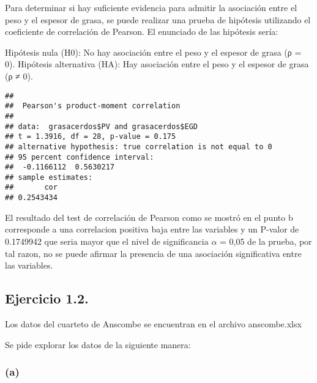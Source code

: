 \documentclass[
]{article}
\newenvironment{Shaded}{\begin{snugshade}}{\end{snugshade}}
\newcommand{\AttributeTok}[1]{\textcolor[rgb]{0.77,0.63,0.00}{#1}}
\newcommand{\FunctionTok}[1]{\textcolor[rgb]{0.00,0.00,0.00}{#1}}
\newcommand{\NormalTok}[1]{#1}
\newcommand{\OtherTok}[1]{\textcolor[rgb]{0.56,0.35,0.01}{#1}}
\newcommand{\SpecialCharTok}[1]{\textcolor[rgb]{0.00,0.00,0.00}{#1}}
\newcommand{\StringTok}[1]{\textcolor[rgb]{0.31,0.60,0.02}{#1}}
\begin{document}
Para determinar si hay suficiente evidencia para admitir la asociación
entre el peso y el espesor de grasa, se puede realizar una prueba de
hipótesis utilizando el coeficiente de correlación de Pearson. El
enunciado de las hipótesis sería:

Hipótesis nula (H0): No hay asociación entre el peso y el espesor de
grasa (ρ = 0). Hipótesis alternativa (HA): Hay asociación entre el peso
y el espesor de grasa (ρ ≠ 0).

\begin{Shaded}
\end{Shaded}

\begin{verbatim}
## 
##  Pearson's product-moment correlation
## 
## data:  grasacerdos$PV and grasacerdos$EGD
## t = 1.3916, df = 28, p-value = 0.175
## alternative hypothesis: true correlation is not equal to 0
## 95 percent confidence interval:
##  -0.1166112  0.5630217
## sample estimates:
##       cor 
## 0.2543434
\end{verbatim}

El resultado del test de correlación de Pearson como se mostró en el
punto b corresponde a una correlacion positiva baja entre las variables
y un P-valor de 0.1749942 que seria mayor que el nivel de significancia
\(\alpha\) = 0,05 de la prueba, por tal razon, no se puede afirmar la
presencia de una asociación significativa entre las variables.

\hypertarget{ejercicio-1.2.}{%
\subsection{Ejercicio 1.2.}\label{ejercicio-1.2.}}

Los datos del cuarteto de Anscombe se encuentran en el archivo
anscombe.xlsx

Se pide explorar los datos de la siguiente manera:

\hypertarget{a-1}{%
\subsubsection{(a)}\label{a-1}}
\end{document}
